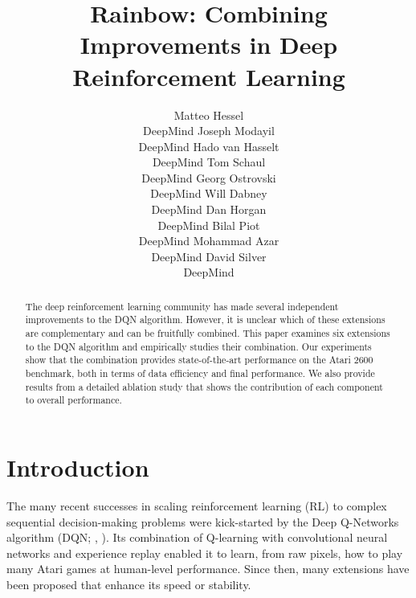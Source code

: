 \documentclass[letterpaper]{article} %
\begin{document}
%

\title{
Rainbow: Combining Improvements in Deep Reinforcement Learning
}
\author{Matteo Hessel\\ DeepMind \And Joseph Modayil\\ DeepMind \And Hado van Hasselt\\ DeepMind
\And Tom Schaul\\ DeepMind \And Georg Ostrovski\\ DeepMind \AND Will Dabney\\ DeepMind \And Dan Horgan\\ DeepMind \And Bilal Piot \\ DeepMind \And Mohammad Azar \\ DeepMind \And David Silver\\ DeepMind
}
\maketitle
\begin{abstract}
The deep reinforcement learning community has made several independent improvements to the DQN algorithm. However, it is unclear which of these extensions are complementary and can be fruitfully combined. This paper examines six extensions to the DQN algorithm and empirically studies their combination.  Our experiments show that the combination provides state-of-the-art performance on the Atari 2600 benchmark, both in terms of data efficiency and final performance. We also provide results from a detailed ablation study that shows the contribution of each component to overall performance.
\end{abstract}

\section{Introduction}

The many recent successes in scaling reinforcement learning (RL) to complex sequential decision-making problems were kick-started by the Deep Q-Networks algorithm (DQN; \citeauthor{Mnih2015} \citeyear{dqn-arxiv}, \citeyear{Mnih2015}). 
Its combination of Q-learning with convolutional neural networks and experience replay enabled it to learn, from raw pixels, how to play many Atari games at human-level performance.
Since then, many extensions have been proposed that enhance its speed or stability. 
\end{document}
